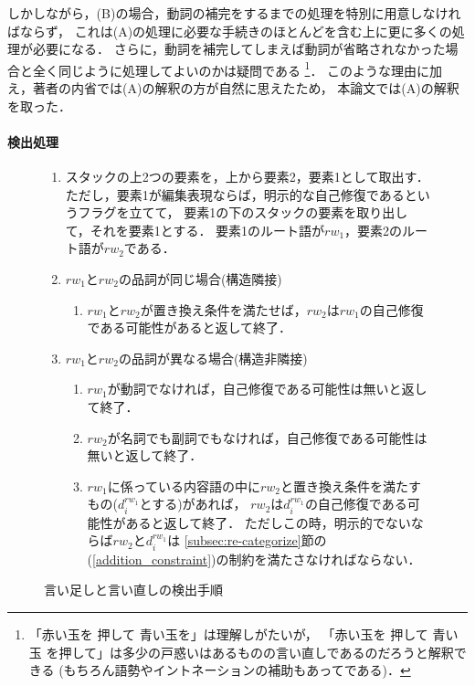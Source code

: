 しかしながら，(B)の場合，動詞の補完をするまでの処理を特別に用意しなければならず，
これは(A)の処理に必要な手続きのほとんどを含む上に更に多くの処理が必要になる．
さらに，動詞を補完してしまえば動詞が省略されなかった場合と全く同じように処理してよいのかは疑問である
\footnote{「赤い玉を 押して 青い玉を」は理解しがたいが，
「赤い玉を 押して 青い玉 を押して」は多少の戸惑いはあるものの言い直しであるのだろうと解釈できる
(もちろん語勢やイントネーションの補助もあってである)．}．
このような理由に加え，著者の内省では(A)の解釈の方が自然に思えたため，
本論文では(A)の解釈を取った．

\paragraph{検出処理}\label{para:DETECTION_RP}

\begin{figure}
\small
\begin{enumerate}
\item スタックの上2つの要素を，上から要素2，要素1として取出す．
ただし，要素1が編集表現ならば，明示的な自己修復であるというフラグを立てて，
要素1の下のスタックの要素を取り出して，それを要素1とする．
要素1のルート語が$rw_1$，要素2のルート語が$rw_2$である．
\item $rw_1$と$rw_2$の品詞が同じ場合(構造隣接)
\begin{enumerate}
\item $rw_1$と$rw_2$が置き換え条件を満たせば，$rw_2$は$rw_1$の自己修復である可能性があると返して終了．
\end{enumerate}
\item $rw_1$と$rw_2$の品詞が異なる場合(構造非隣接)
\begin{enumerate}
\item $rw_1$が動詞でなければ，自己修復である可能性は無いと返して終了．
\item $rw_2$が名詞でも副詞でもなければ，自己修復である可能性は無いと返して終了．
\item $rw_1$に係っている内容語の中に$rw_2$と置き換え条件を満たすもの($d_i^{rw_1}$とする)があれば，
$rw_2$は$d_i^{rw_1}$の自己修復である可能性があると返して終了．
ただしこの時，明示的でないならば$rw_2$と$d_i^{rw_1}$は
\ref{subsec:re-categorize}節の(\ref{addition_constraint})の制約を満たさなければならない．
\end{enumerate}
\end{enumerate}
\caption{言い足しと言い直しの検出手順}
\label{fig:DETECTION_RP}
\end{figure}

